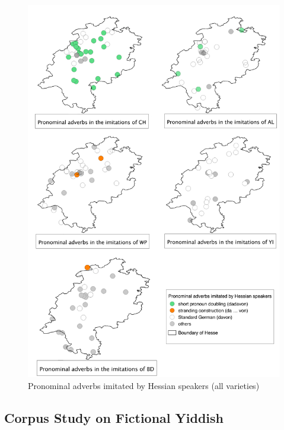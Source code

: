 \documentclass[output=paper]{LSP/langsci}
\begin{document}
\begin{figure}[h!]
\centering
\includegraphics[scale=0.49]{illustrations/schaf_etal_fig4}%
		\caption{\label{diagramdadavonhessen} Pronominal adverbs imitated by Hessian speakers (all varieties)}
	\end{figure}
 
	
\subsection{Corpus Study on Fictional Yiddish}\label{fiyi}
 
\end{document}
